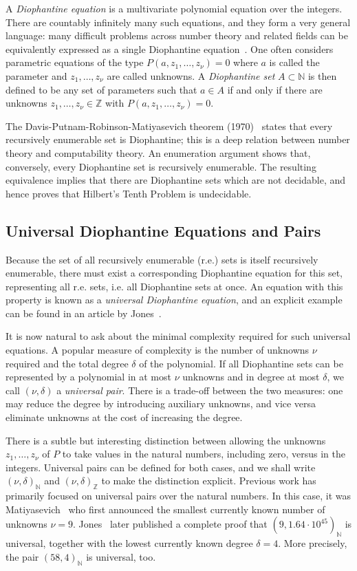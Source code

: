 \documentclass[a4paper,USenglish,cleveref,autoref,thm-restate]{lipics-v2021}
\newcommand{\N}{{\mathbb N}}
\newcommand{\Z}{{\mathbb Z}}
\begin{document}
A \emph{Diophantine equation} is a multivariate polynomial equation over the integers. There are countably infinitely many such equations, and they form a very general language: many difficult problems across number theory and related fields can be equivalently expressed as a single Diophantine equation~\cite{riemann-register-machine}. One often considers parametric equations of the type $P(a, z_1, \ldots, z_\nu)=0$ where $a$ is called the parameter and $z_1, \ldots, z_\nu$ are called unknowns. A \emph{Diophantine set} $A \subset \N$ is then defined to be any set of parameters such that $a \in A$ if and only if there are unknowns $z_1, \ldots, z_\nu \in \Z$ with $P(a, z_1, \ldots, z_\nu) = 0$.

The Davis-Putnam-Robinson-Matiyasevich theorem (1970)~\cite[Chapter~1]{matiyasevich-book} states that every recursively enumerable set is Diophantine; this is a deep relation between number theory and computability theory. An enumeration argument shows that, conversely, every Diophantine set is recursively enumerable. The resulting equivalence implies that there are Diophantine sets which are not decidable, and hence proves that Hilbert's Tenth Problem is undecidable.

\subsection{Universal Diophantine Equations and Pairs}
Because the set of all recursively enumerable (r.e.) sets is itself recursively enumerable, there must exist a corresponding Diophantine equation for this set, representing all r.e. sets, i.e. all Diophantine sets at once. An equation with this property is known as a \emph{universal Diophantine equation}, and an explicit example can be found in an article by Jones~\cite{9var}.

It is now natural to ask about the minimal complexity required for such universal equations. A popular measure of complexity is the number of unknowns $\nu$ required and the total degree $\delta$ of the polynomial. If all Diophantine sets can be represented by a polynomial in at most $\nu$ unknowns and in degree at most $\delta$, we call $(\nu, \delta)$ a \emph{universal pair}. There is a trade-off between the two measures: one may reduce the degree by introducing auxiliary unknowns, and vice versa eliminate unknowns at the cost of increasing the degree.

There is a subtle but interesting distinction between allowing the unknowns $z_1, \ldots, z_\nu$ of $P$ to take values in the natural numbers, including zero, versus in the integers. Universal pairs can be defined for both cases, and we shall write $(\nu, \delta)_\N$ and $(\nu, \delta)_\Z$ to make the distinction explicit. Previous work has primarily focused on universal pairs over the natural numbers.
In this case, it was Matiyasevich~\cite{M77} who first announced the smallest currently known number of unknowns $\nu = 9$. Jones~\cite{9var} later published a complete proof that $(9, 1.64 \cdot 10^{45})_\N$ is universal, together with the lowest currently known degree $\delta = 4$. More precisely, the pair $(58, 4)_\N$ is universal, too.
\end{document}
